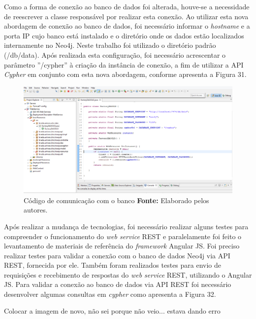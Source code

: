 \par Como a forma de conexão ao banco de dados foi alterada, houve-se a necessidade de reescrever a classe responsável por realizar esta conexão. Ao utilizar esta nova abordagem de conexão ao banco de dados, foi necessário informar o \textit{hostname} e a porta IP cujo banco está instalado e o diretório onde os dados estão localizados internamente no Neo4j. Neste trabalho foi utilizado o diretório padrão (/db/data). Após realizada esta configuração, foi necessário acrescentar o parâmetro ''/cypher'' à criação da instância de conexão, a fim de utilizar a API \textit{Cypher} em conjunto com esta nova abordagem, conforme apresenta a Figura 31.

\begin{figure}[h!]
	\centerline{\includegraphics[scale=0.35]{./imagens/conexao-banco.jpg}}
	\caption[Código de comunicação com o banco]
	{Código de comunicação com o banco \textbf{Fonte:} Elaborado pelos autores.}
	\label{fig:exemplo1}
\end{figure}

\par Após realizar a mudança de tecnologias, foi necessário realizar alguns testes para compreender o funcionamento do \textit{web service} REST e paralelamente foi feito o levantamento de materiais de referência do \textit{framework} Angular JS. Foi preciso realizar testes para validar a conexão com o banco de dados Neo4j via API REST, fornecida por ele. Também foram realizados testes para envio de requisições e recebimento de respostas do \textit{web service} REST, utilizando o Angular JS. Para validar a conexão ao banco de dados via API REST foi necessário desenvolver algumas consultas em \textit{cypher} como apresenta a Figura 32.

\newpage
Colocar a imagem de novo, não sei porque não veio... estava dando erro 

